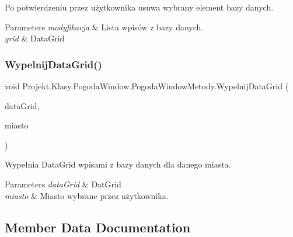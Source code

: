 Po potwierdzeniu przez użytkownika usuwa wybrany element bazy danych. 


\begin{DoxyParams}{Parameters}
{\em modyfikacja} & Lista wpisów z bazy danych.\\
\hline
{\em grid} & Data\+Grid\\
\hline
\end{DoxyParams}
\mbox{\label{class_projekt_1_1_klasy_1_1_pogoda_window_1_1_pogoda_window_metody_a7c01d8d4ec88ec2f1bda388c4147d2b6}} 
\subsubsection{\texorpdfstring{WypelnijDataGrid()}{WypelnijDataGrid()}}
{\footnotesize\ttfamily void Projekt.\+Klasy.\+Pogoda\+Window.\+Pogoda\+Window\+Metody.\+Wypelnij\+Data\+Grid (\begin{DoxyParamCaption}\item[{Data\+Grid}]{data\+Grid,  }\item[{string}]{miasto }\end{DoxyParamCaption})}



Wypełnia Data\+Grid wpisami z bazy danych dla danego miasta. 


\begin{DoxyParams}{Parameters}
{\em data\+Grid} & Dat\+Grid\\
\hline
{\em miasto} & Miasto wybrane przez użytkownika.\\
\hline
\end{DoxyParams}


\subsection{Member Data Documentation}
\mbox{\label{class_projekt_1_1_klasy_1_1_pogoda_window_1_1_pogoda_window_metody_a83c3d93d6f5240995a53ed912484d500}} 
